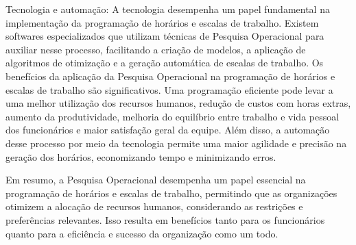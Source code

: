 Tecnologia e automação: A tecnologia desempenha um papel fundamental na implementação da programação de horários e escalas de trabalho. Existem softwares especializados que utilizam técnicas de Pesquisa Operacional para auxiliar nesse processo, facilitando a criação de modelos, a aplicação de algoritmos de otimização e a geração automática de escalas de trabalho.
Os benefícios da aplicação da Pesquisa Operacional na programação de horários e escalas de trabalho são significativos. Uma programação eficiente pode levar a uma melhor utilização dos recursos humanos, redução de custos com horas extras, aumento da produtividade, melhoria do equilíbrio entre trabalho e vida pessoal dos funcionários e maior satisfação geral da equipe. Além disso, a automação desse processo por meio da tecnologia permite uma maior agilidade e precisão na geração dos horários, economizando tempo e minimizando erros.

Em resumo, a Pesquisa Operacional desempenha um papel essencial na programação de horários e escalas de trabalho, permitindo que as organizações otimizem a alocação de recursos humanos, considerando as restrições e preferências relevantes. Isso resulta em benefícios tanto para os funcionários quanto para a eficiência e sucesso da organização como um todo.